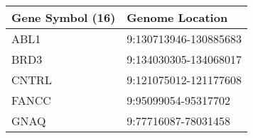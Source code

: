\begin{tabular}{ll}
\toprule
Gene Symbol (16) &       Genome Location \\
\midrule
            ABL1 & 9:130713946-130885683 \\
            BRD3 & 9:134030305-134068017 \\
           CNTRL & 9:121075012-121177608 \\
           FANCC &   9:95099054-95317702 \\
            GNAQ &   9:77716087-78031458 \\
\bottomrule
\end{tabular}
